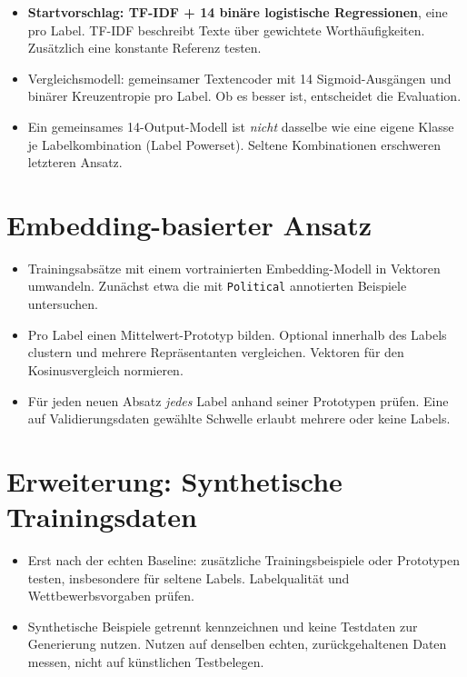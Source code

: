 \documentclass[10pt,a4paper]{article}
\begin{document}
\begin{itemize}
  \item \textbf{Startvorschlag: TF-IDF + 14 binäre logistische Regressionen}, eine pro Label.
        TF-IDF beschreibt Texte über gewichtete Worthäufigkeiten. Zusätzlich eine konstante Referenz testen.
  \item Vergleichsmodell: gemeinsamer Textencoder mit 14 Sigmoid-Ausgängen und binärer
        Kreuzentropie pro Label. Ob es besser ist, entscheidet die Evaluation.
  \item Ein gemeinsames 14-Output-Modell ist \emph{nicht} dasselbe wie eine eigene Klasse je
        Labelkombination (Label Powerset). Seltene Kombinationen erschweren letzteren Ansatz.
\end{itemize}

\section{Embedding-basierter Ansatz}

\begin{itemize}
  \item Trainingsabsätze mit einem vortrainierten Embedding-Modell in Vektoren umwandeln.
        Zunächst etwa die mit \texttt{Political} annotierten Beispiele untersuchen.
  \item Pro Label einen Mittelwert-Prototyp bilden. Optional innerhalb des Labels clustern
        und mehrere Repräsentanten vergleichen. Vektoren für den Kosinusvergleich normieren.
  \item Für jeden neuen Absatz \emph{jedes} Label anhand seiner Prototypen prüfen.
        Eine auf Validierungsdaten gewählte Schwelle erlaubt mehrere oder keine Labels.
\end{itemize}

\section{Erweiterung: Synthetische Trainingsdaten}

\begin{itemize}
  \item Erst nach der echten Baseline: zusätzliche Trainingsbeispiele oder Prototypen testen,
        insbesondere für seltene Labels. Labelqualität und Wettbewerbsvorgaben prüfen.
  \item Synthetische Beispiele getrennt kennzeichnen und keine Testdaten zur Generierung nutzen.
        Nutzen auf denselben echten, zurückgehaltenen Daten messen, nicht auf künstlichen Testbelegen.
\end{itemize}
\end{document}

